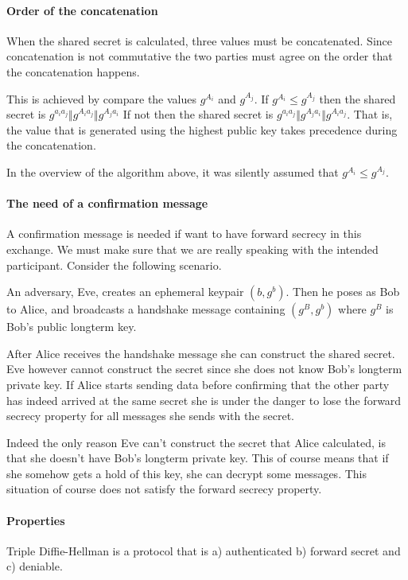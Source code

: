 \paragraph{Order of the concatenation}
When the shared secret is calculated, three values must be concatenated. Since
concatenation is not commutative the two parties must agree on the order that the
concatenation happens.

This is achieved by compare the values $g^{A_i}$ and $g^{A_j}$. If
$g^{A_i} \le g^{A_j}$ then the shared secret is $g^{a_ia_j} \Vert g^{A_ia_j} \Vert g^{A_ja_i}$
If not then the shared secret is $g^{a_ia_j} \Vert g^{A_ja_i} \Vert g^{A_ia_j}$. That is, the
value that is generated using the highest public key takes precedence during the
concatenation.

In the overview of the algorithm above, it was silently assumed that
$g^{A_i} \le g^{A_j}$.

\paragraph{The need of a confirmation message}
\label{confirm_message_explain}
A confirmation message is needed if want to have forward secrecy in this exchange.
We must make sure that we are really speaking with the intended participant. Consider
the following scenario.

An adversary, Eve, creates an ephemeral keypair $(b, g^b)$. Then he poses as Bob to Alice,
and broadcasts a handshake message containing $(g^B,g^b)$ where $g^B$ is Bob's
public longterm key.

After Alice receives the handshake message she can construct the shared secret. Eve
however cannot construct the secret since she does not know Bob's longterm
private key. If Alice starts sending data before confirming that the other party
has indeed arrived at the same secret she is under the danger to lose the forward
secrecy property for all messages she sends with the secret.

Indeed the only reason Eve can't construct the secret that Alice calculated, is
that she doesn't have Bob's longterm private key. This of course means that if
she somehow gets a hold of this key, she can decrypt some messages. This situation
of course does not satisfy the forward secrecy property.


\paragraph{Properties}
Triple Diffie-Hellman is a protocol that is a) authenticated b) forward secret
and c) deniable.

